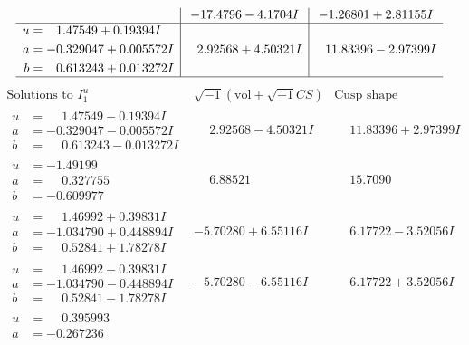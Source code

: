 \documentclass[1p]{elsarticle_modified}
\theoremstyle{definition}
\newcommand{\I}{\sqrt{-1}}
\begin{document}
$$\begin{array}{c|c|c}
 & -17.4796 - 4.1704 I & -1.26801 + 2.81155 I \\ \hline\begin{aligned}
u &= \phantom{-}1.47549 + 0.19394 I \\
a &= -0.329047 + 0.005572 I \\
b &= \phantom{-}0.613243 + 0.013272 I\end{aligned}
 & \phantom{-}2.92568 + 4.50321 I & \phantom{-}11.83396 - 2.97399 I\\
 \hline 
 \end{array}$$\newpage$$\begin{array}{c|c|c}  
\text{Solutions to }I^u_{1}& \I (\text{vol} + \sqrt{-1}CS) & \text{Cusp shape}\\
 \hline 
\begin{aligned}
u &= \phantom{-}1.47549 - 0.19394 I \\
a &= -0.329047 - 0.005572 I \\
b &= \phantom{-}0.613243 - 0.013272 I\end{aligned}
 & \phantom{-}2.92568 - 4.50321 I & \phantom{-}11.83396 + 2.97399 I \\ \hline\begin{aligned}
u &= -1.49199\phantom{ +0.000000I} \\
a &= \phantom{-}0.327755\phantom{ +0.000000I} \\
b &= -0.609977\phantom{ +0.000000I}\end{aligned}
 & \phantom{-}6.88521\phantom{ +0.000000I} & \phantom{-}15.7090\phantom{ +0.000000I} \\ \hline\begin{aligned}
u &= \phantom{-}1.46992 + 0.39831 I \\
a &= -1.034790 + 0.448894 I \\
b &= \phantom{-}0.52841 + 1.78278 I\end{aligned}
 & -5.70280 + 6.55116 I & \phantom{-}6.17722 - 3.52056 I \\ \hline\begin{aligned}
u &= \phantom{-}1.46992 - 0.39831 I \\
a &= -1.034790 - 0.448894 I \\
b &= \phantom{-}0.52841 - 1.78278 I\end{aligned}
 & -5.70280 - 6.55116 I & \phantom{-}6.17722 + 3.52056 I \\ \hline\begin{aligned}
u &= \phantom{-}0.395993\phantom{ +0.000000I} \\
a &= -0.267236\phantom{ +0.000000I} \\

\end{aligned}
\end{array}$$
\end{document}
